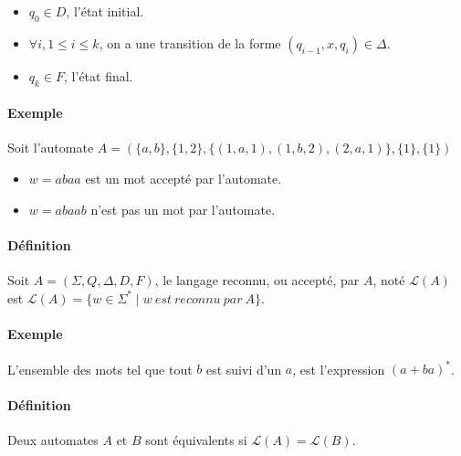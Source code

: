 \begin{itemize}
	\item $q_0 \in D$, l'état initial.
	\item $\forall i, 1 \leq i \leq k$, on a une transition de la forme $(q_{i-1},x,q_{i}) \in \Delta$.
	\item $q_k \in F$, l'état final.
\end{itemize}



\paragraph{Exemple} %
\label{par:exemple}

Soit l'automate $A=(\{a,b\},\{1,2\},\{(1,a,1),(1,b,2),(2,a,1)\},\{1\},\{1\})$
\begin{itemize}
	\item $w=abaa$ est un mot accepté par l'automate.
	\item $w=abaab$ n'est pas un mot par l'automate.
\end{itemize}



\paragraph{Définition} %
\label{par:d_finition}

Soit $A=(\Sigma,Q,\Delta,D,F)$, le langage reconnu, ou accepté, par $A$, noté $\mathcal{L}(A)$ est $\mathcal{L}(A)=\{w \in \Sigma^* \mid w\ est\ reconnu\ par\ A\}$.



\paragraph{Exemple} %
\label{par:exemple}

L'ensemble des mots tel que tout $b$ est suivi d'un $a$, est l'expression $(a+ba)^*$.



\paragraph{Définition} %
\label{par:d_finition}

Deux automates $A$ et $B$ sont équivalents si $\mathcal{L}(A)=\mathcal{L}(B)$.



